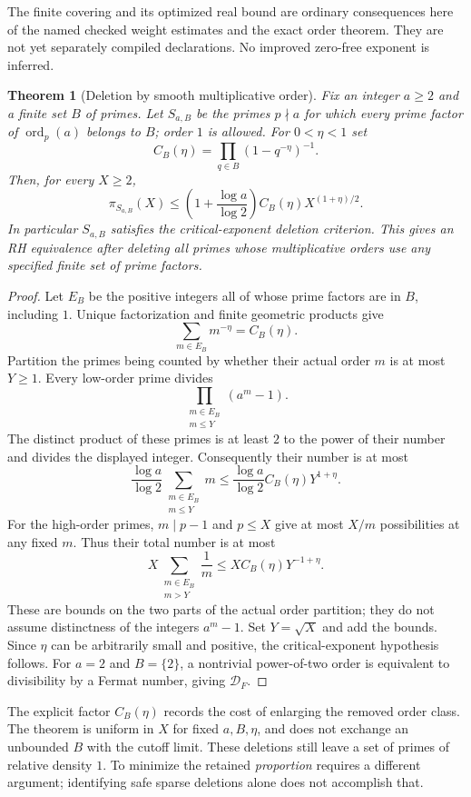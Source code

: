 \documentclass[11pt]{article}
\newtheorem{theorem}{Theorem}[section]
\theoremstyle{definition}
\begin{document}
The finite covering and its optimized real bound are ordinary
consequences here of the named checked weight estimates and
the exact order theorem. They are not yet separately compiled
declarations. No improved zero-free exponent is inferred.

\begin{theorem}[Deletion by smooth multiplicative order]
\label{thm:smooth-order-deletion}
Fix an integer $a\ge2$ and a finite set $B$ of primes. Let
$S_{a,B}$ be the primes $p\nmid a$ for which every prime
factor of $\operatorname{ord}_p(a)$ belongs to $B$; order $1$
is allowed. For $0<\eta<1$ set
\[
 C_B(\eta)=\prod_{q\in B}(1-q^{-\eta})^{-1}.
\]
Then, for every $X\ge2$,
\[
 \pi_{S_{a,B}}(X)
 \le\left(1+\frac{\log a}{\log2}\right)
          C_B(\eta)X^{(1+\eta)/2}.
\]
In particular $S_{a,B}$ satisfies the critical-exponent deletion
criterion. This gives an RH equivalence after deleting all
primes whose multiplicative orders use any specified finite
set of prime factors.
\end{theorem}

\begin{proof}
Let $E_B$ be the positive integers all of whose prime factors
are in $B$, including $1$. Unique factorization and finite
geometric products give
\[
 \sum_{m\in E_B}m^{-\eta}=C_B(\eta).
\]
Partition the primes being counted by whether their actual
order $m$ is at most $Y\ge1$. Every low-order prime divides
\[
 \prod_{\substack{m\in E_B\\m\le Y}}(a^m-1).
\]
The distinct product of these primes is at least $2$ to the
power of their number and divides the displayed integer.
Consequently their number is at most
\[
 \frac{\log a}{\log2}
      \sum_{\substack{m\in E_B\\m\le Y}}m
 \le\frac{\log a}{\log2}C_B(\eta)Y^{1+\eta}.
\]
For the high-order primes, $m\mid p-1$ and $p\le X$ give
at most $X/m$ possibilities at any fixed $m$. Thus their
total number is at most
\[
 X\sum_{\substack{m\in E_B\\m>Y}}\frac1m
 \le X C_B(\eta)Y^{-1+\eta}.
\]
These are bounds on the two parts of the actual order
partition; they do not assume distinctness of the integers
$a^m-1$. Set $Y=\sqrt X$ and add the bounds.
Since $\eta$ can be arbitrarily small and positive, the
critical-exponent hypothesis follows. For $a=2$ and
$B=\{2\}$, a nontrivial power-of-two order is equivalent
to divisibility by a Fermat number, giving $\mathcal D_F$.
\end{proof}

The explicit factor $C_B(\eta)$ records the cost of enlarging
the removed order class. The theorem is uniform in $X$ for
fixed $a,B,\eta$, and does not exchange an unbounded $B$
with the cutoff limit. These deletions still leave a set of
primes of relative density $1$. To minimize the retained
\emph{proportion} requires a different argument; identifying
safe sparse deletions alone does not accomplish that.
\end{document}
